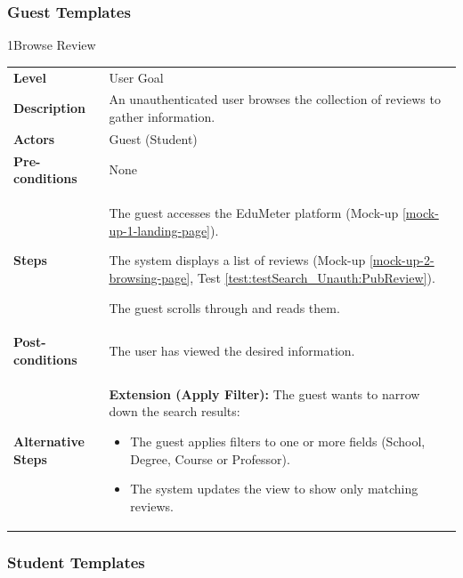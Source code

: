 \subsubsection{Guest Templates}
\vspace{1em}
\begin{usecasetable}{1}{Browse Review}
	\begin{tabularx}{\textwidth}{@{} l|X @{}}
		\textbf{Level} & User Goal \\
		\textbf{Description} & An unauthenticated user browses the collection of reviews to gather information. \\
		\textbf{Actors} & Guest (Student) \\
		\textbf{Pre-conditions} & None \\
		\textbf{Steps} & 
		\begin{tabenum}
			\item The guest accesses the EduMeter platform (Mock-up \ref{mock-up-1-landing-page}).
			\item The system displays a list of reviews (Mock-up \ref{mock-up-2-browsing-page}, Test \ref{test:testSearch_Unauth:PubReview}).
			\item The guest scrolls through and reads them.
		\end{tabenum} \\
		\textbf{Post-conditions} & The user has viewed the desired information. \\
		\textbf{Alternative Steps} & 
		\begin{tabitem}
			\item[2a.] \textbf{Extension (Apply Filter):} The guest wants to narrow down the search results:
			\begin{itemize}
				\item The guest applies filters to one or more fields (School, Degree, Course or Professor).
				\item The system updates the view to show only matching reviews.
			\end{itemize}
		\end{tabitem}
	\end{tabularx}
\end{usecasetable}

\subsubsection{Student Templates}

